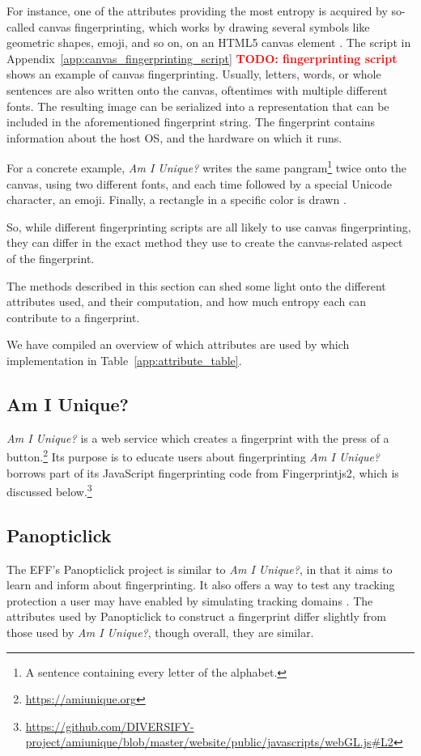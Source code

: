 \documentclass[
    fontsize=12pt,
    headings=small,
    parskip=half,
    bibliography=totoc,
    numbers=noenddot,
    open=any
    ]{scrreprt}
\newcommand{\todo}[1]{\textcolor{red}{\textbf{TODO: #1}}}
\begin{document}
For instance, one of the attributes providing the most entropy is acquired by so-called canvas fingerprinting, which works by drawing
several symbols like geometric shapes, emoji, and so on, on an HTML5 canvas element \cite{laperdrix2016beauty}.
The script in Appendix~\ref{app:canvas_fingerprinting_script} \todo{fingerprinting script} shows an example of canvas fingerprinting.
Usually, letters, words, or whole sentences are also written onto the canvas, oftentimes with multiple different fonts.
The resulting image can be serialized into a representation that can be included in the aforementioned fingerprint string.
The fingerprint contains information about the host OS, and the hardware on which it runs.

For a concrete example, \textit{Am I Unique?} writes the same pangram\footnote{A sentence containing every letter of the alphabet.}
twice onto the canvas, using two different fonts, and each time followed by a special Unicode character, an emoji.
Finally, a rectangle in a specific color is drawn \cite{laperdrix2016beauty}.

So, while different fingerprinting scripts are all likely to use canvas fingerprinting, they can differ in the exact
method they use to create the canvas-related aspect of the fingerprint.

The methods described in this section can shed some light onto the different attributes used, and their computation,
and how much entropy each can contribute to a fingerprint.

We have compiled an overview of which attributes are used by which implementation in Table~\ref{app:attribute_table}.


\subsection{Am I Unique?}
\label{related_work:am_i_unique}
\textit{Am I Unique?} \cite{laperdrix2016beauty} is a web service which creates
a fingerprint with the press of a button.\footnote{\url{https://amiunique.org}}
Its purpose is to educate users about fingerprinting
\textit{Am I Unique?} borrows part of its JavaScript fingerprinting code from
Fingerprintjs2, which is discussed below.\footnote{\url{https://github.com/DIVERSIFY-project/amiunique/blob/master/website/public/javascripts/webGL.js\#L2}}


\subsection{Panopticlick}
\label{related_work:panopticlick}
The EFF's Panopticlick project is similar to \textit{Am I Unique?}, in that it aims to learn and inform about
fingerprinting. It also offers a way to test any tracking protection a user may have enabled by simulating
tracking domains \cite{panopticlick}. The attributes used by Panopticlick to construct a fingerprint differ slightly from those used by
\textit{Am I Unique?}, though overall, they are similar.
\end{document}
